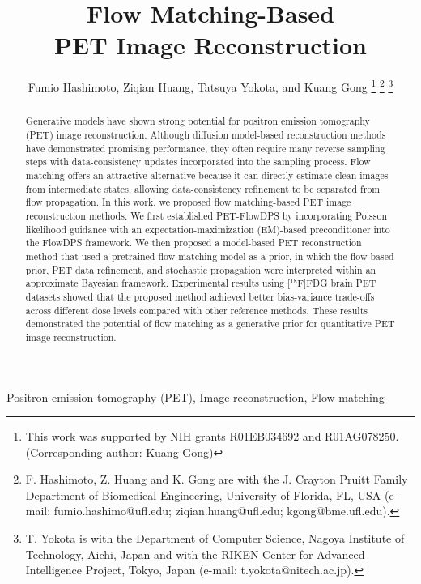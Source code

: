 \documentclass[journal]{IEEEtran}
\begin{document}
\title{Flow Matching-Based\\PET Image Reconstruction}
\author{Fumio Hashimoto, Ziqian Huang, Tatsuya Yokota, and Kuang Gong
\thanks{This work was supported by NIH grants R01EB034692 and R01AG078250. (Corresponding author: Kuang Gong)}
\thanks{F. Hashimoto, Z. Huang and K. Gong are with the J. Crayton Pruitt Family Department of Biomedical Engineering, University of Florida, FL, USA (e-mail: fumio.hashimo@ufl.edu; ziqian.huang@ufl.edu; kgong@bme.ufl.edu).}
\thanks{T. Yokota is with the Department of Computer Science, Nagoya Institute of Technology, Aichi, Japan and with the RIKEN Center for Advanced Intelligence Project, Tokyo, Japan (e-mail: t.yokota@nitech.ac.jp).}}

\maketitle

\begin{abstract}
Generative models have shown strong potential for positron emission tomography (PET) image reconstruction. Although diffusion model-based reconstruction methods have demonstrated promising performance, they often require many reverse sampling steps with data-consistency updates incorporated into the sampling process. Flow matching offers an attractive alternative because it can directly estimate clean images from intermediate states, allowing data-consistency refinement to be separated from flow propagation. In this work, we proposed flow matching-based PET image reconstruction methods. We first established PET-FlowDPS by incorporating Poisson likelihood guidance with an expectation-maximization (EM)-based preconditioner into the FlowDPS framework. We then proposed a model-based PET reconstruction method that used a pretrained flow matching model as a prior, in which the flow-based prior, PET data refinement, and stochastic propagation were interpreted within an approximate Bayesian framework. Experimental results using [$^{\text{18}}\text{F}$]FDG brain PET datasets showed that the proposed method achieved better bias-variance trade-offs across different dose levels compared with other reference methods. These results demonstrated the potential of flow matching as a generative prior for quantitative PET image reconstruction.
\end{abstract}

\begin{IEEEkeywords}
Positron emission tomography (PET), Image reconstruction, Flow matching
\end{IEEEkeywords}
\end{document}
